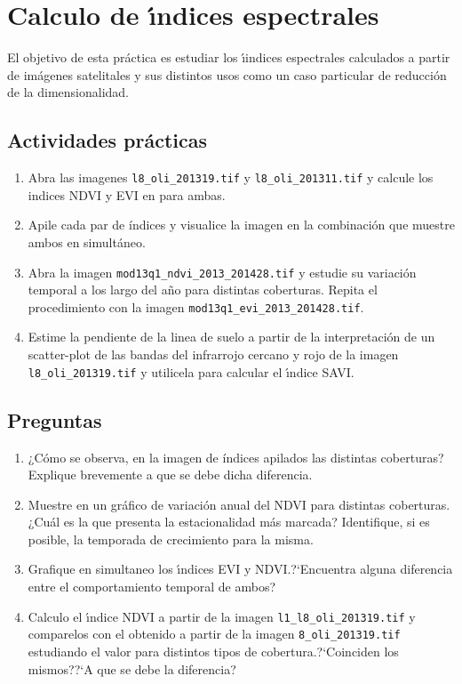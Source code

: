 \documentclass[hidelinks,12pt]{article}
\begin{document}
\section{Calculo de \'{\i}ndices espectrales}
El objetivo de esta práctica es estudiar los \'{\i}indices espectrales
calculados a partir de  imágenes satelitales y sus distintos usos como un caso
particular de reducci\'on de la dimensionalidad.

\subsection{Actividades pr\'acticas}
\begin{enumerate}
    \item Abra las imagenes \texttt{l8\_oli\_2013\-19.tif} y 
        \texttt{l8\_oli\_2013\-11.tif} y calcule los indices NDVI y EVI en 
        para ambas.
    \item Apile cada par de  índices y visualice la imagen en la combinación que 
        muestre ambos en simultáneo.
    \item Abra la imagen \texttt{mod13q1\_ndvi\_2013\_2014\-28.tif} y 
        estudie su variaci\'on temporal a los largo del a\~no para distintas 
        coberturas. Repita el procedimiento con la imagen 
        \texttt{mod13q1\_evi\_2013\_2014\-28.tif}.
    \item Estime la pendiente de la linea de suelo a partir de la
        interpretaci\'on de un scatter-plot de las bandas del infrarrojo cercano
        y rojo de la imagen \texttt{l8\_oli\_2013\-19.tif} y utilicela para
        calcular el \'{\i}ndice SAVI\@.
\end{enumerate}

\subsection{Preguntas}
\begin{enumerate}
    \item ¿Cómo se observa, en la imagen de índices apilados las distintas
        coberturas? Explique brevemente a que se debe dicha diferencia.
    \item Muestre en un gráfico de variación anual del NDVI para distintas coberturas.
        ¿Cuál es la que presenta la estacionalidad más marcada? Identifique, si es
        posible, la temporada de crecimiento para la misma.
    \item Grafique en simultaneo los \'{\i}ndices EVI y NDVI.?`Encuentra alguna
        diferencia entre el comportamiento temporal de ambos? 
    \item Calculo el \'{\i}ndice NDVI a partir de la imagen
        \texttt{l1\_l8\_oli\_2013\-19.tif}
        y comparelos con el obtenido a partir de la
        imagen \texttt{8\_oli\_2013\-19.tif} estudiando el valor para distintos
        tipos de cobertura.?`Coinciden los mismos??`A que se debe la
        diferencia?
\end{enumerate}
\newpage
\end{document}
